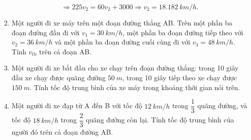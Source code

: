 \begin{enumerate}[label=\bfseries Câu \arabic*:]
{		$$\Rightarrow 225 v_2 = 60 v_2 + 3000 \Rightarrow v_2 = \SI{18,182}{km/h}.$$
	}
	\item {}
	
	{
		
		Một người đi xe máy trên một đoạn đường thẳng AB. Trên một phần ba đoạn đường đầu đi với $v_1 = \SI{30}{km/h}$, một phần ba đoạn đường tiếp theo với $v_2 = \SI{36}{km/h}$ và một phần ba đoạn đường cuối cùng đi với $v_3= \SI{48}{km/h}$. Tính $v_\text{tb}$ trên cả đoạn AB.
		
	}
	\item {}
	
	{
		
		Một người đi xe bắt đầu cho xe chạy trên đoạn đường thẳng: trong 10 giây đầu xe chạy được quãng đường $\SI{50}{m}$, trong 10 giây tiếp theo xe chạy được $\SI{150}{m}$. Tính tốc độ trung bình của xe máy trong khoảng thời gian nói trên.
	}
	\item {}
	
	{
		
		Một người đi xe đạp từ A đến B với tốc độ $\SI{12}{km/h}$ trong $\dfrac{1}{3}$ quãng đường, và tốc độ $\SI{18}{km/h}$ trong $\dfrac{2}{3}$ quãng đường còn lại. Tính tốc độ trung bình của người đó trên cả đoạn đường AB.
	}
\end{enumerate}
